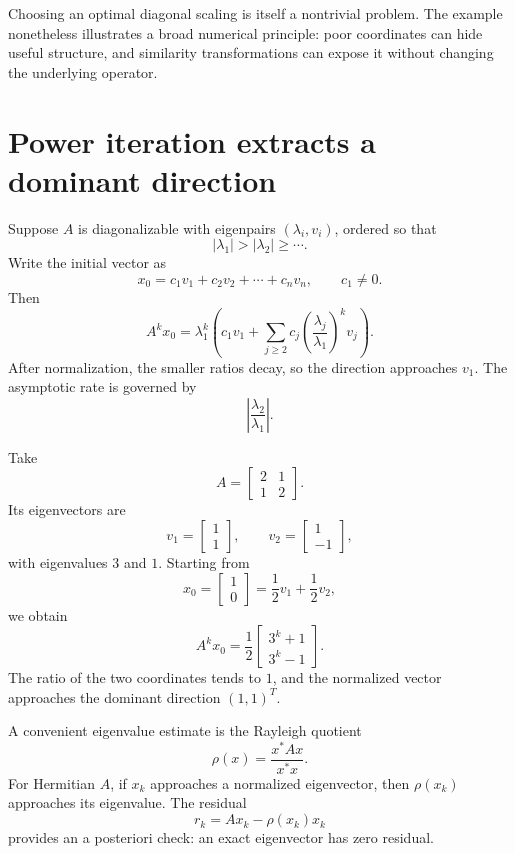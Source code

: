 Choosing an optimal diagonal scaling is itself a nontrivial problem.  The example nonetheless illustrates a broad numerical principle: poor coordinates can hide useful structure, and similarity transformations can expose it without changing the underlying operator.

\section{Power iteration extracts a dominant direction}

Suppose \(A\) is diagonalizable with eigenpairs \((\lambda_i,v_i)\), ordered so that
\[
  |\lambda_1|>|\lambda_2|\ge\cdots.
\]
Write the initial vector as
\[
  x_0=c_1v_1+c_2v_2+\cdots+c_nv_n,
  \qquad c_1\ne0.
\]
Then
\[
  A^kx_0
  =\lambda_1^k
  \left(
    c_1v_1+\sum_{j\ge2}c_j
    \left(\frac{\lambda_j}{\lambda_1}\right)^kv_j
  \right).
\]
After normalization, the smaller ratios decay, so the direction approaches \(v_1\).  The asymptotic rate is governed by
\[
  \left|\frac{\lambda_2}{\lambda_1}\right|.
\]

Take
\[
  A=
  \begin{bmatrix}
    2&1\\
    1&2
  \end{bmatrix}.
\]
Its eigenvectors are
\[
  v_1=\begin{bmatrix}1\\1\end{bmatrix},
  \qquad
  v_2=\begin{bmatrix}1\\-1\end{bmatrix},
\]
with eigenvalues \(3\) and \(1\).  Starting from
\[
  x_0=\begin{bmatrix}1\\0\end{bmatrix}
  =\frac12v_1+\frac12v_2,
\]
we obtain
\[
  A^kx_0
  =\frac12
  \begin{bmatrix}
    3^k+1\\
    3^k-1
  \end{bmatrix}.
\]
The ratio of the two coordinates tends to \(1\), and the normalized vector approaches the dominant direction \((1,1)^T\).

A convenient eigenvalue estimate is the Rayleigh quotient
\[
  \rho(x)=\frac{x^*Ax}{x^*x}.
\]
For Hermitian \(A\), if \(x_k\) approaches a normalized eigenvector, then \(\rho(x_k)\) approaches its eigenvalue.  The residual
\[
  r_k=Ax_k-\rho(x_k)x_k
\]
provides an a posteriori check: an exact eigenvector has zero residual.

